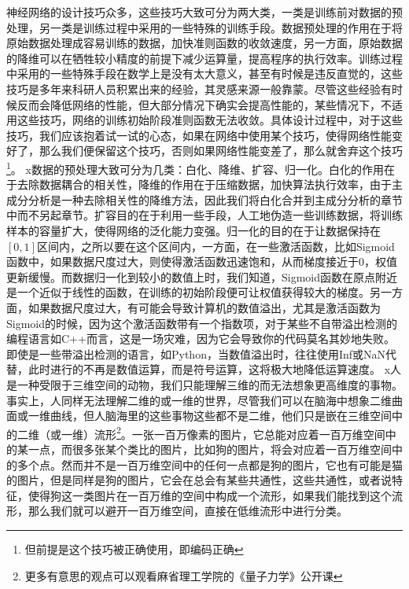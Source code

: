 神经网络的设计技巧众多，这些技巧大致可分为两大类，一类是训练前对数据的预处理，另一类是训练过程中采用的一些特殊的训练手段。数据预处理的作用在于将原始数据处理成容易训练的数据，加快准则函数的收敛速度，另一方面，原始数据的降维可以在牺牲较小精度的前提下减少运算量，提高程序的执行效率。训练过程中采用的一些特殊手段在数学上是没有太大意义，甚至有时候是违反直觉的，这些技巧是多年来科研人员积累出来的经验，其灵感来源一般靠蒙。尽管这些经验有时候反而会降低网络的性能，但大部分情况下确实会提高性能的，某些情况下，不适用这些技巧，网络的训练初始阶段准则函数无法收敛。具体设计过程中，对于这些技巧，我们应该抱着试一试的心态，如果在网络中使用某个技巧，使得网络性能变好了，那么我们便保留这个技巧，否则如果网络性能变差了，那么就舍弃这个技巧\footnote{但前提是这个技巧被正确使用，即编码正确}。
x数据的预处理大致可分为几类：白化、降维、扩容、归一化。白化的作用在于去除数据耦合的相关性，降维的作用在于压缩数据，加快算法执行效率，由于主成分分析是一种去除相关性的降维方法，因此我们将白化合并到主成分分析的章节中而不另起章节。扩容目的在于利用一些手段，人工地伪造一些训练数据，将训练样本的容量扩大，使得网络的泛化能力变强。归一化的目的在于让数据保持在$[0,1]$区间内，之所以要在这个区间内，一方面，在一些激活函数，比如Sigmoid函数中，如果数据尺度过大，则使得激活函数迅速饱和，从而梯度接近于0，权值更新缓慢。而数据归一化到较小的数值上时，我们知道，Sigmoid函数在原点附近是一个近似于线性的函数，在训练的初始阶段便可让权值获得较大的梯度。另一方面，如果数据尺度过大，有可能会导致计算机的数值溢出，尤其是激活函数为Sigmoid的时候，因为这个激活函数带有一个指数项，对于某些不自带溢出检测的编程语言如C++而言，这是一场灾难，因为它会导致你的代码莫名其妙地失败。即使是一些带溢出检测的语言，如Python，当数值溢出时，往往使用Inf或NaN代替，此时进行的不再是数值运算，而是符号运算，这将极大地降低运算速度。
x人是一种受限于三维空间的动物，我们只能理解三维的而无法想象更高维度的事物。事实上，人同样无法理解二维的或一维的世界，尽管我们可以在脑海中想象二维曲面或一维曲线，但人脑海里的这些事物这些都不是二维，他们只是嵌在三维空间中的二维（或一维）流形\footnote{更多有意思的观点可以观看麻省理工学院的《量子力学》公开课}。一张一百万像素的图片，它总能对应着一百万维空间中的某一点，而很多张某个类比的图片，比如狗的图片，将会对应着一百万维空间中的多个点。然而并不是一百万维空间中的任何一点都是狗的图片，它也有可能是猫的图片，但是同样是狗的图片，它会在总会有某些共通性，这些共通性，或者说特征，使得狗这一类图片在一百万维的空间中构成一个流形，如果我们能找到这个流形，那么我们就可以避开一百万维空间，直接在低维流形中进行分类。

